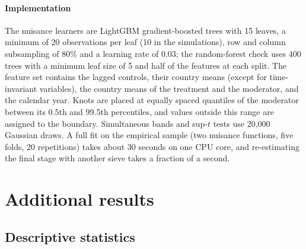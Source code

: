 \documentclass[pdflatex,sn-basic]{sn-jnl}%
\theoremstyle{thmstyleone}
\theoremstyle{thmstyletwo}
\begin{document}
\begin{appendices}
\paragraph{Implementation}
The nuisance learners are LightGBM gradient-boosted trees \citep{ke2017lightgbm} with 15 leaves, a minimum of 20 observations per leaf (10 in the simulations), row and column subsampling of 80\% and a learning rate of 0.03; the random-forest check uses 400 trees \citep{breiman2001rf} with a minimum leaf size of 5 and half of the features at each split. The feature set contains the lagged controls, their country means (except for time-invariant variables), the country means of the treatment and the moderator, and the calendar year. Knots are placed at equally spaced quantiles of the moderator between its 0.5th and 99.5th percentiles, and values outside this range are assigned to the boundary. Simultaneous bands and sup-$t$ tests use 20,000 Gaussian draws. A full fit on the empirical sample (two nuisance functions, five folds, 20 repetitions) takes about 30 seconds on one CPU core, and re-estimating the final stage with another sieve takes a fraction of a second.

\section{Additional results}\label{app:tables}


\subsection*{Descriptive statistics}


\end{appendices}
\end{document}
